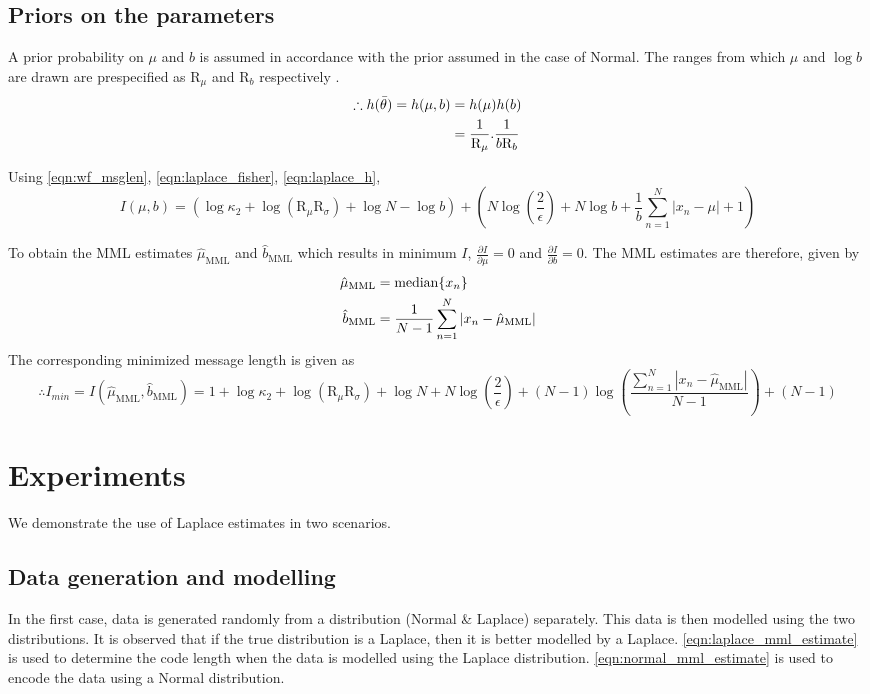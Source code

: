 \documentclass[wcp]{jmlr}
\begin{document}
\subsection*{Priors on the parameters}
A prior probability on $\mu$ and $b$ is assumed in accordance with the prior assumed
in the case of Normal. The ranges from which $\mu$ and $\log b$ are drawn are prespecified as 
$\mathrm{R}_{\mu}$ and $\mathrm{R}_{b}$ respectively \citep{WallaceBook}. 
\begin{align} 
\therefore h(\bar{\theta}) = h(\mu,b) &= h(\mu) h(b) \notag\\
      &= \frac{1}{\mathrm{R}_{\mu}}. \frac{1}{b \mathrm{R}_{b}} \label{eqn:laplace_h} 
\end{align}

Using \eqref{eqn:wf_msglen}, \eqref{eqn:laplace_fisher}, \eqref{eqn:laplace_h},
\begin{dmath*}
 I(\mu,b) = \left( \log\kappa_2 + \log(\mathrm{R}_{\mu}\mathrm{R}_{\sigma}) + \log N - \log b \right) + \left( N\log\left(\frac{2}{\epsilon}\right) + N\log b + \frac{1}{b}\sum_{n=1}^N |x_n-\mu| + 1 \right)
\end{dmath*} 

\noindent To obtain the MML estimates $\hat{\mu}_{\mathrm{MML}}$ and $\hat{b}_{\mathrm{MML}}$ 
which results in minimum $I$, $\frac{\partial I}{\partial \mu} = 0$ and 
$\frac{\partial I}{\partial b} = 0$. The MML estimates are therefore, given by
\begin{align}
  \hat{\mu}_{\mathrm{MML}} &= \mathrm{median}\{x_n\} \notag\\
  \hat{b}_{\mathrm{MML}} &= \frac{1}{N-1} \sum_{n=1}^N |x_n-\hat{\mu}_{\mathrm{MML}}| 
  \label{eqn:laplace_estimate}
\end{align}
The corresponding minimized message length is given as
\begin{dmath}
 \therefore I_{min} = I(\hat{\mu}_{\mathrm{MML}},\hat{b}_{\mathrm{MML}}) = 1 + \log\kappa_2 + \log(\mathrm{R}_{\mu}\mathrm{R}_{\sigma}) + \log N + N\log\left(\frac{2}{\epsilon}\right) + (N-1) \log \left( \frac{\sum_{n=1}^N |x_n-\hat{\mu}_{\mathrm{MML}}|}{N-1} \right) + (N-1) \label{eqn:laplace_mml_estimate}
\end{dmath} 

\section{Experiments}
We demonstrate the use of Laplace estimates in two scenarios. 

\subsection{Data generation and modelling}
In the first case, data is generated randomly from a distribution (Normal \& Laplace) 
separately. This data is then modelled using the two distributions.
It is observed that if the true distribution is a Laplace, then it is better
modelled by a Laplace. \eqref{eqn:laplace_mml_estimate} is used to determine
the code length when the data is modelled using the Laplace distribution.
\eqref{eqn:normal_mml_estimate} is used to encode the data using a Normal
distribution. \\
\end{document}

